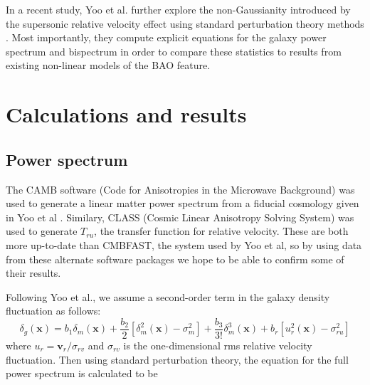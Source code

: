 \documentclass[12pt]{article}
\begin{document}
In a recent study, Yoo et al. further explore the non-Gaussianity introduced by the supersonic relative velocity effect using standard perturbation theory methods \cite{Yooetal}. Most importantly, they compute explicit equations for the galaxy power spectrum and bispectrum in order to compare these statistics to results from existing non-linear models of the BAO feature.

\section{Calculations and results}
\subsection{Power spectrum}
The CAMB software (Code for Anisotropies in the Microwave Background) was used to generate a linear matter power spectrum from a fiducial cosmology given in Yoo et al \cite{Yooetal}. Similary, CLASS (Cosmic Linear Anisotropy Solving System) was used to generate $T_{ru}$, the transfer function for relative velocity. These are both more up-to-date than CMBFAST, the system used by Yoo et al, so by using data from these alternate software packages we hope to be able to confirm some of their results.

Following Yoo et al., we assume a second-order term in the galaxy density fluctuation as follows:
\begin{equation}
\delta_{g}(\textbf{x}) = b_{1}\delta_{m}(\textbf{x})+\frac{b_{2}}{2} [\delta_{m}^{2}(\textbf{x})-\sigma_{m}^{2}]+\frac{b_{3}}{3!}\delta_{m}^{3}(\textbf{x})+b_{r} [u_{r}^{2}(\textbf{x})-\sigma_{ru}^{2}]
\end{equation}
where $u_{r} =\textbf{v}_{r}/\sigma_{rv}$ and $\sigma_{rv}$ is the one-dimensional rms relative velocity fluctuation. Then using standard perturbation theory, the equation for the full power spectrum is calculated to be 
\end{document}
